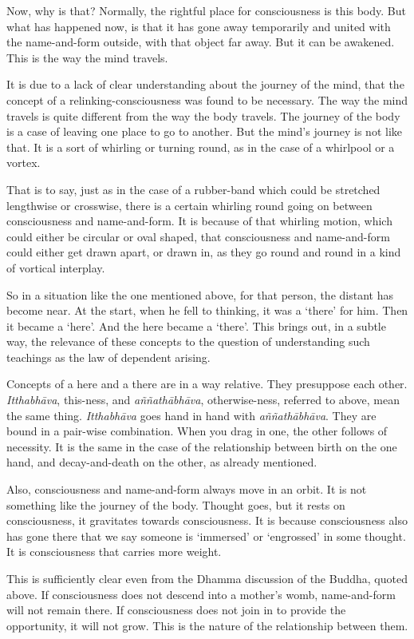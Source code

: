 Now, why is that? Normally, the rightful place for consciousness is this body. But what has happened now, is that it has gone away temporarily and united with the name-and-form outside, with that object far away. But it can be awakened. This is the way the mind travels.

It is due to a lack of clear understanding about the journey of the mind, that the concept of a relinking-consciousness was found to be necessary. The way the mind travels is quite different from the way the body travels. The journey of the body is a case of leaving one place to go to another. But the mind's journey is not like that. It is a sort of whirling or turning round, as in the case of a whirlpool or a vortex.

That is to say, just as in the case of a rubber-band which could be stretched lengthwise or crosswise, there is a certain whirling round going on between consciousness and name-and-form. It is because of that whirling motion, which could either be circular or oval shaped, that consciousness and name-and-form could either get drawn apart, or drawn in, as they go round and round in a kind of vortical interplay.

So in a situation like the one mentioned above, for that person, the distant has become near. At the start, when he fell to thinking, it was a `there' for him. Then it became a `here'. And the here became a `there'. This brings out, in a subtle way, the relevance of these concepts to the question of understanding such teachings as the law of dependent arising.

Concepts of a here and a there are in a way relative. They presuppose each other. \emph{Itthabhāva}, this-ness, and \emph{aññathābhāva}, otherwise-ness, referred to above, mean the same thing. \emph{Itthabhāva} goes hand in hand with \emph{aññathābhāva}. They are bound in a pair-wise combination. When you drag in one, the other follows of necessity. It is the same in the case of the relationship between birth on the one hand, and decay-and-death on the other, as already mentioned.

Also, consciousness and name-and-form always move in an orbit. It is not something like the journey of the body. Thought goes, but it rests on consciousness, it gravitates towards consciousness. It is because consciousness also has gone there that we say someone is `immersed' or `engrossed' in some thought. It is consciousness that carries more weight.

This is sufficiently clear even from the Dhamma discussion of the Buddha, quoted above. If consciousness does not descend into a mother's womb, name-and-form will not remain there. If consciousness does not join in to provide the opportunity, it will not grow. This is the nature of the relationship between them.

